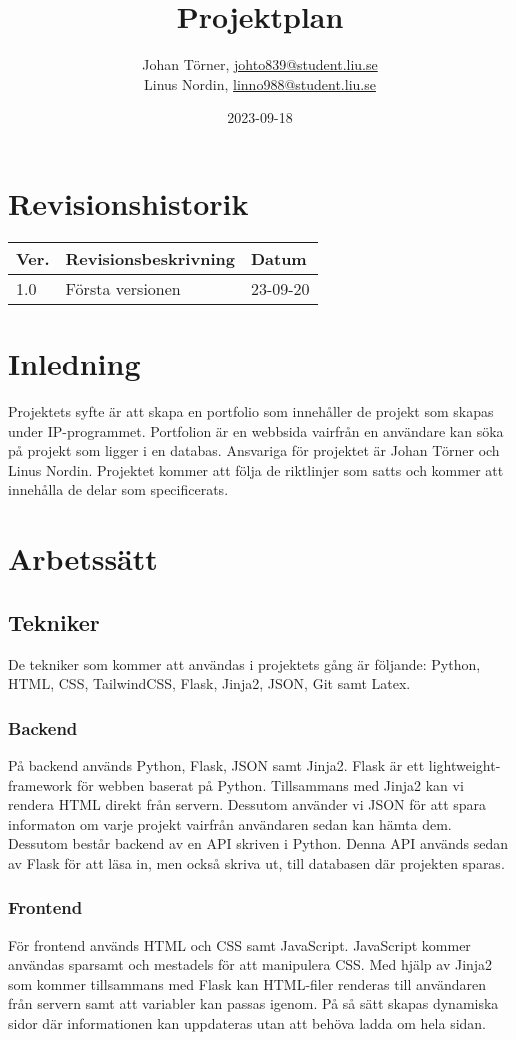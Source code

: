 \documentclass{TDP003mall}
\author{Johan Törner, \url{johto839@student.liu.se}\\
  Linus Nordin, \url{linno988@student.liu.se}}
\title{Projektplan}
\date{2023-09-18}
\begin{document}
\projectpage
\section{Revisionshistorik}
\begin{table}[!h]
\begin{tabularx}{\linewidth}{|l|X|l|}
\hline
Ver. & Revisionsbeskrivning & Datum \\\hline
1.0 & Första versionen & 23-09-20\\\hline
\end{tabularx}
\end{table}


\section{Inledning}
Projektets syfte är att skapa en portfolio som innehåller de projekt som skapas under IP-programmet. 
Portfolion är en webbsida vairfrån en användare kan söka på projekt som ligger i en databas. Ansvariga för projektet 
är Johan Törner och Linus Nordin. Projektet kommer att följa de riktlinjer som satts och kommer att innehålla de delar
som specificerats. 


\section{Arbetssätt}

\subsection{Tekniker}
De tekniker som kommer att användas i projektets gång är följande: Python, HTML, CSS, TailwindCSS, Flask, Jinja2, JSON, Git samt Latex. 

\subsubsection{Backend}
På backend används Python, Flask, JSON samt Jinja2. Flask är ett lightweight-framework för webben baserat på Python.
Tillsammans med Jinja2 kan vi rendera HTML direkt från servern. Dessutom använder vi JSON för att spara informaton om varje projekt vairfrån
användaren sedan kan hämta dem. Dessutom består backend av en API skriven i Python.
Denna API används sedan av Flask för att läsa in, men också skriva ut, till databasen där
projekten sparas. 


\subsubsection{Frontend}
För frontend används HTML och CSS samt JavaScript. JavaScript kommer användas sparsamt
och mestadels för att manipulera CSS. Med hjälp av Jinja2 som kommer tillsammans med Flask kan
HTML-filer renderas till användaren från servern samt att variabler kan passas igenom.
På så sätt skapas dynamiska sidor där informationen kan uppdateras utan att behöva
ladda om hela sidan.
\end{document}
